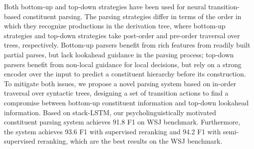 Both bottom-up and top-down strategies have been used for neural transition-based constituent parsing. The parsing strategies differ in terms of the order in which they recognize productions in the derivation tree, where bottom-up strategies and top-down strategies take post-order and pre-order traversal over trees, respectively. Bottom-up parsers benefit from rich features from readily built partial parses, but lack lookahead guidance in the parsing process; top-down parsers benefit from non-local guidance for local decisions, but rely on a strong encoder over the input to predict a constituent hierarchy before its construction. To mitigate both issues, we propose a novel parsing system based on in-order traversal over syntactic trees, designing a set of transition actions to find a compromise between bottom-up constituent information and top-down lookahead information. Based on stack-LSTM, our psycholinguistically motivated constituent parsing system achieves 91.8 F1 on WSJ benchmark. Furthermore, the system achieves 93.6 F1 with supervised reranking and 94.2 F1 with semi-supervised reranking, which are the best results on the WSJ benchmark.

